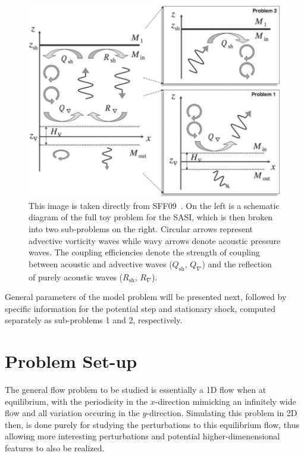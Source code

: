 \begin{figure}
\centering
\includegraphics[width=13cm]{figures/Sato1}
\caption {This image is taken directly from SFF09~\cite{Sato2009}. On the left is a schematic diagram of the full toy problem for the SASI,  which is then broken into two sub-problems on the right. Circular arrows represent advective vorticity waves while wavy arrows denote acoustic pressure waves. The coupling efficiencies denote the strength of coupling between acoustic and advective waves ($Q_\textrm{sh}$, $Q_\nabla$) and the reflection of purely acoustic waves ($R_\textrm{sh}$, $R_\nabla$).}
\label{fig:Sato1}
\end{figure}

General parameters of the model problem will be presented next, followed by specific information for the potential step and stationary shock, computed separately as sub-problems 1 and 2, respectively. 


\section{Problem Set-up}
\label{sec:TP_set_up}

The general flow problem to be studied is essentially a 1D flow when at equilibrium, with the periodicity in the $x$-direction mimicking an infinitely wide flow and all variation occuring in the $y$-direction. Simulating this problem in 2D then, is done purely for studying the perturbations to this equilibrium flow, thus allowing more interesting perturbations and potential higher-dimenensional features to also be realized.

